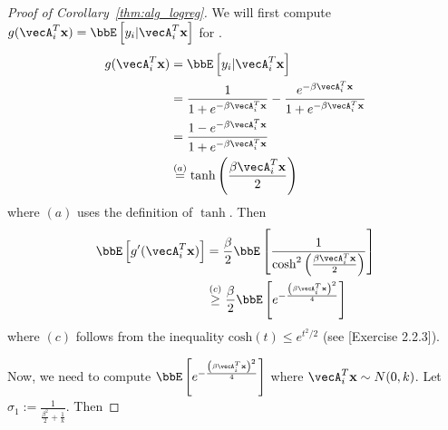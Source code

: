 \begin{proof}[Proof of Corollary~\ref{thm:alg_logreg}]
We will first compute $g(\vecA_i^T\bx) = \bbE\insq{y_i|\vecA_i^T\bx}$ for \logreg.
\begin{align*}
g(\vecA_i^T\bx)&=\bbE\insq{y_i|\vecA_i^T\bx}\\
&= \frac{1}{1+e^{-\beta \vecA_i^T\bx}}-\frac{e^{-\beta \vecA_i^T\bx}}{1+e^{-\beta \vecA_i^T\bx}}\\
&=\frac{1-e^{-\beta \vecA_i^T\bx}}{1+e^{-\beta \vecA_i^T\bx}}\\
& \stackrel{(a)}{=} {\tanh\inp{\frac{\beta \vecA_i^T\bx}{2}}}
\end{align*}where $(a)$ uses the definition of $\tanh$. Then
\begin{align*}
\bbE\insq{g'(\vecA_i^T\bx)} &= \frac{\beta}{2}\bbE\insq{\frac{1}{{\text{cosh}}^2\inp{\frac{\beta \vecA_i^T\bx}{2}}}}\\
& \stackrel{(c)}{\geq}\frac{\beta}{2}\bbE\insq{e^{-\frac{\inp{\beta\vecA_i^T\bx}^2}{4}}}
\end{align*} where $(c)$ follows from the inequality $\text{cosh}(t)\leq e^{t^2/2}$ (see [Exercise 2.2.3]\cite{vershynin}). 


Now, we need to compute $\bbE\insq{e^{-\frac{\inp{\beta\vecA_i^T\bx}^2}{4}}}$ where $\vecA_i^T\bx\sim N(0,k)$. Let $\sigma_1 := \frac{1}{\frac{\beta^2}{2}+\frac{1}{k}}$. Then


\end{proof}
